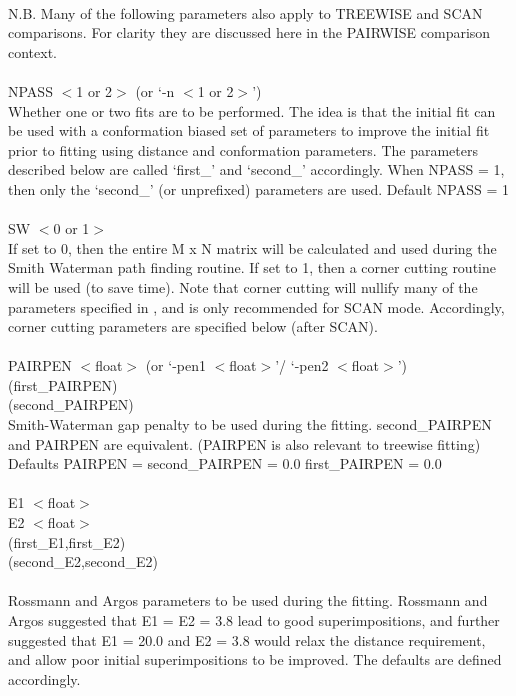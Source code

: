 \\
N.B. Many of the following parameters also apply to TREEWISE and
SCAN comparisons.  For clarity they are discussed here in the
PAIRWISE comparison context.\\
\\
NPASS $<$1 or 2$>$ (or `-n  $<$1 or 2$>$')\\
Whether one or two fits are to be performed.  The idea is that the 
initial fit can be used with a conformation biased set of
parameters to improve the initial fit prior to fitting using
distance and conformation parameters.  The parameters described
below are called `first\_' and `second\_' accordingly.  When NPASS =
1, then only the `second\_' (or unprefixed) parameters are used.
Default NPASS = 1\\
\\
SW $<$0 or 1$>$ \\
If set to 0, then the entire M x N matrix will be calculated and
used during the Smith Waterman path finding routine.  If set to 1,
then a corner cutting routine will be used (to save time).  Note
that corner cutting will nullify many of the parameters specified
in \cite{rb92b}, and is only recommended for SCAN mode. 
Accordingly, corner cutting parameters are specified below (after
SCAN).\\
\\
PAIRPEN $<$float$>$ (or `-pen1 $<$float$>$'/ `-pen2 $<$float$>$')\\
(first\_PAIRPEN)\\
(second\_PAIRPEN)\\
Smith-Waterman gap penalty to be used during the fitting. 
second\_PAIRPEN and PAIRPEN are equivalent. (PAIRPEN is also
relevant to treewise fitting)\\
Defaults PAIRPEN = second\_PAIRPEN = 0.0  first\_PAIRPEN = 0.0\\
\\
E1 $<$float$>$ \\
E2 $<$float$>$\\
(first\_E1,first\_E2)\\
(second\_E2,second\_E2)\\
\\
Rossmann and Argos parameters to be used during the fitting.
Rossmann and Argos suggested that E1 = E2 = 3.8 lead to good
superimpositions, and further suggested that E1 = 20.0 and E2 = 3.8
would relax the distance requirement, and allow poor initial
superimpositions to be improved.  The defaults are defined
accordingly.
\\
